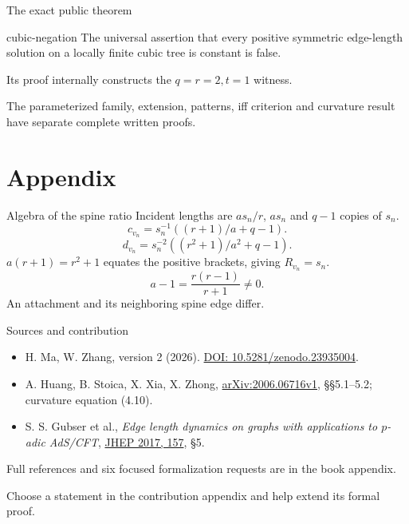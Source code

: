 \documentclass{beamer}
\begin{document}
\begin{frame}{The exact public theorem}
\small
\begin{bookresult}{cubic-negation}
The universal assertion that every positive symmetric edge-length solution on a locally finite cubic tree is constant is false.
\end{bookresult}
Its proof internally constructs the $q=r=2,t=1$ witness.

The parameterized family, extension, patterns, iff criterion and curvature result have separate complete written proofs.
\end{frame}
\appendix
\section{Appendix}
\begin{frame}{Algebra of the spine ratio}
\small
Incident lengths are $as_n/r$, $as_n$ and $q-1$ copies of $s_n$.
\[
c_{v_n}=s_n^{-1}((r+1)/a+q-1).
\]
\[
d_{v_n}=s_n^{-2}((r^2+1)/a^2+q-1).
\]
$a(r+1)=r^2+1$ equates the positive brackets, giving $R_{v_n}=s_n$.
\[
a-1=\frac{r(r-1)}{r+1}\ne0.
\]
An attachment and its neighboring spine edge differ.
\end{frame}
\begin{frame}{Sources and contribution}
\footnotesize
\begin{itemize}
\item H. Ma, W. Zhang, version 2 (2026). \href{https://doi.org/10.5281/zenodo.23935004}{DOI: 10.5281/zenodo.23935004}.
\item A. Huang, B. Stoica, X. Xia, X. Zhong, \href{https://arxiv.org/abs/2006.06716v1}{arXiv:2006.06716v1}, §§5.1--5.2; curvature equation (4.10).
\item S. S. Gubser et al., \emph{Edge length dynamics on graphs with applications to $p$-adic AdS/CFT}, \href{https://doi.org/10.1007/JHEP06(2017)157}{JHEP 2017, 157}, §5.
\end{itemize}
Full references and six focused formalization requests are in the book appendix.

Choose a statement in the contribution appendix and help extend its formal proof.
\end{frame}
\FormalVerification
\end{document}
